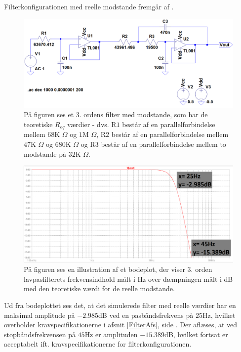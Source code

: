 \noindent Filterkonfigurationen med reelle modstande fremgår af .
\begin{figure}[H]
	\centering
	\includegraphics[scale=0.4]{figures/cProblemloesning/Sim_reel_modstande.PNG}
	\caption{På figuren ses et 3. ordens filter med modstande, som har de teoretiske $R_{eq}$ værdier - dvs. R$1$ består af en parallelforbindelse mellem $68$K $\Omega$ og $1$M $\Omega$, R$2$ består af en parallelforbindelse mellem $47$K $\Omega$ og $680$K $\Omega$ og R$3$ består af en parallelforbindelse mellem to modstande på $32$K $\Omega$.}
	\label{fig:Sim_reel_modstande}
\end{figure}

\begin{figure}[H]
	\centering
	\includegraphics[scale=0.35]{figures/cProblemloesning/Sim_reel_graf.PNG}
	\caption{På figuren ses en illustration af et bodeplot, der viser 3. orden lavpasfilterets frekvensindhold målt i Hz over dæmpningen målt i dB med den teoretiske værdi for de reelle modstande.}
	\label{fig:Sim_reel_graf}
\end{figure}

\noindent Ud fra bodeplottet ses det, at det simulerede filter med reelle værdier har en maksimal amplitude på $-2.985$dB ved en pasbåndsfrekvens på $25$Hz, hvilket overholder kravspecifikationerne i afsnit \ref{FilterAfs}, side \pageref{FilterAfs}. Der aflæses, at ved stopbåndsfrekvensen på $45$Hz er amplituden $-15.389$dB, hvilket fortsat er acceptabelt ift. kravspecifikationerne for filterkonfigurationen. 

